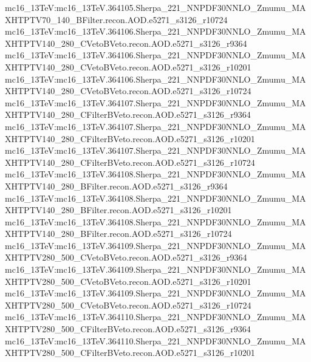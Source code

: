 { mc16\_13TeV:mc16\_13TeV.364105.Sherpa\_221\_NNPDF30NNLO\_Zmumu\_MAXHTPTV70\_140\_BFilter.recon.AOD.e5271\_s3126\_r10724  \newline   
 mc16\_13TeV:mc16\_13TeV.364106.Sherpa\_221\_NNPDF30NNLO\_Zmumu\_MAXHTPTV140\_280\_CVetoBVeto.recon.AOD.e5271\_s3126\_r9364 \newline    
 mc16\_13TeV:mc16\_13TeV.364106.Sherpa\_221\_NNPDF30NNLO\_Zmumu\_MAXHTPTV140\_280\_CVetoBVeto.recon.AOD.e5271\_s3126\_r10201 \newline    
 mc16\_13TeV:mc16\_13TeV.364106.Sherpa\_221\_NNPDF30NNLO\_Zmumu\_MAXHTPTV140\_280\_CVetoBVeto.recon.AOD.e5271\_s3126\_r10724 \newline    
 mc16\_13TeV:mc16\_13TeV.364107.Sherpa\_221\_NNPDF30NNLO\_Zmumu\_MAXHTPTV140\_280\_CFilterBVeto.recon.AOD.e5271\_s3126\_r9364 \newline    
 mc16\_13TeV:mc16\_13TeV.364107.Sherpa\_221\_NNPDF30NNLO\_Zmumu\_MAXHTPTV140\_280\_CFilterBVeto.recon.AOD.e5271\_s3126\_r10201 \newline    
 mc16\_13TeV:mc16\_13TeV.364107.Sherpa\_221\_NNPDF30NNLO\_Zmumu\_MAXHTPTV140\_280\_CFilterBVeto.recon.AOD.e5271\_s3126\_r10724 \newline    
 mc16\_13TeV:mc16\_13TeV.364108.Sherpa\_221\_NNPDF30NNLO\_Zmumu\_MAXHTPTV140\_280\_BFilter.recon.AOD.e5271\_s3126\_r9364 \newline    
 mc16\_13TeV:mc16\_13TeV.364108.Sherpa\_221\_NNPDF30NNLO\_Zmumu\_MAXHTPTV140\_280\_BFilter.recon.AOD.e5271\_s3126\_r10201 \newline    
 mc16\_13TeV:mc16\_13TeV.364108.Sherpa\_221\_NNPDF30NNLO\_Zmumu\_MAXHTPTV140\_280\_BFilter.recon.AOD.e5271\_s3126\_r10724 \newline    
 mc16\_13TeV:mc16\_13TeV.364109.Sherpa\_221\_NNPDF30NNLO\_Zmumu\_MAXHTPTV280\_500\_CVetoBVeto.recon.AOD.e5271\_s3126\_r9364 \newline    
 mc16\_13TeV:mc16\_13TeV.364109.Sherpa\_221\_NNPDF30NNLO\_Zmumu\_MAXHTPTV280\_500\_CVetoBVeto.recon.AOD.e5271\_s3126\_r10201 \newline    
 mc16\_13TeV:mc16\_13TeV.364109.Sherpa\_221\_NNPDF30NNLO\_Zmumu\_MAXHTPTV280\_500\_CVetoBVeto.recon.AOD.e5271\_s3126\_r10724 \newline    
 mc16\_13TeV:mc16\_13TeV.364110.Sherpa\_221\_NNPDF30NNLO\_Zmumu\_MAXHTPTV280\_500\_CFilterBVeto.recon.AOD.e5271\_s3126\_r9364  \newline   
 mc16\_13TeV:mc16\_13TeV.364110.Sherpa\_221\_NNPDF30NNLO\_Zmumu\_MAXHTPTV280\_500\_CFilterBVeto.recon.AOD.e5271\_s3126\_r10201 \newline    
}
